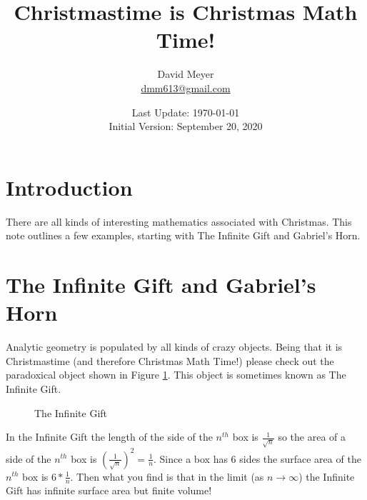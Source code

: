 \documentclass{article}
\title{Christmastime is Christmas Math Time!}
\author{David Meyer \\ \href{mailto:dmm613@gmail.com}
                            {dmm613@gmail.com}}
\date{Last Update: \today \\
	 {\vspace{1.00mm} \small Initial Version: September 20, 2020}}
\theoremstyle{definition}
\begin{document}
\maketitle

%
%
%
\section {Introduction}

There are all kinds of interesting mathematics associated
with Christmas. This note outlines a few examples, starting
with The Infinite Gift and Gabriel's Horn.
%
%
%
\section{The Infinite Gift and Gabriel's Horn}
Analytic geometry is populated by all kinds of crazy
objects. Being that it is Christmastime (and therefore 
Christmas Math Time!) please check out the paradoxical 
object shown in Figure \ref{fig:infinite_gift}. This 
object is sometimes known as The Infinite Gift.


\medskip
\bigskip
\begin{figure} [H]
\caption{The Infinite Gift}
\label{fig:infinite_gift}
\end{figure}

\bigskip
{
\noindent
In the Infinite Gift the length of the side of the $n^{th}$ box
is $\frac{1}{\sqrt{n}}$ so the area of a side of the $n^{th}$ box
is ${\left ( \frac{1}{\sqrt{n}}\right ) }^2 = \frac{1}{n}$.
Since a box has 6 sides the surface area of the $n^{th}$ box is
$6 * \frac{1}{n}$. Then what you find is that in the limit (as $n
\to \infty$) the Infinite Gift has infinite surface area but
finite volume!  \par}
\end{document}
